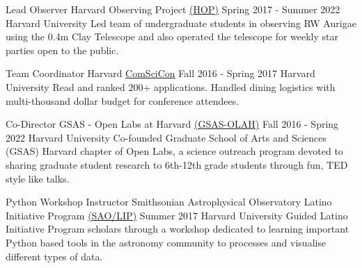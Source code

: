 
\begin{cventries}
    
  \cventry
    {Lead Observer} %
    {Harvard Observing Project \href{http://www.fas.harvard.edu/~astrolab/hop.html}{(HOP)}} %
    {Spring 2017 - Summer 2022} %
    {Harvard University} %
    {Led team of undergraduate students in observing RW Aurigae using the 0.4m Clay Telescope and also operated the telescope for weekly star parties open to the public.}

  \cventry
    {Team Coordinator} %
    {Harvard \href{http://comscicon.com/}{ComSciCon}} %
    {Fall 2016 - Spring 2017} %
    {Harvard University} %
    {Read and ranked 200+ applications. Handled dining logistics with multi-thousand dollar budget for conference attendees.}

  \cventry
    {Co-Director} %
    {GSAS - Open Labs at Harvard \href{https://theopenlabs.org/}{(GSAS-OLAH)}} %
    {Fall 2016 - Spring 2022} %
    {Harvard University} %
    {Co-founded Graduate School of Arts and Sciences (GSAS) Harvard chapter of Open Labs, a science outreach program devoted to sharing graduate student research to 6th-12th grade students through fun, TED style like talks.}

  \cventry
    {Python Workshop Instructor} %
    {Smithsonian Astrophysical Observatory Latino Initiative Program \href{https://www.cfa.harvard.edu/opportunities/lsamp/}{(SAO/LIP)}} %
    {Summer 2017} %
    {Harvard University} %
    {Guided Latino Initiative Program scholars through a workshop dedicated to learning important Python based tools in the astronomy community to processes and visualise different types of data.}
    
\end{cventries}